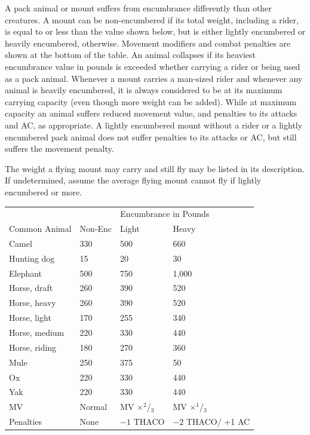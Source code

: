 \begin{multicols}{2}
A pack animal or mount suffers from encumbrance differently than other creatures.  A mount can be non-encumbered if its total weight, including a rider, is equal to or less than the value shown below, but is either lightly encumbered or heavily encumbered, otherwise.  Movement modifiers and combat penalties are shown at the bottom of the table.  An animal collapses if its heaviest encumbrance value in pounds is exceeded whether carrying a rider or being used as a pack animal.  Whenever a mount carries a man-sized rider and whenever any animal is heavily encumbered, it is always considered to be at its maximum carrying capacity (even though more weight can be added).  While at maximum capacity an animal suffers reduced movement value, and penalties to its attacks and AC, as appropriate.  A lightly encumbered mount without a rider or a lightly encumbered pack animal does not suffer penalties to its attacks or AC, but still suffers the movement penalty.  

The weight a flying mount may carry and still fly may be listed in its description.  If undetermined, assume the average flying mount cannot fly if lightly encumbered or more.

\noindent
\begin{minipage}{\columnwidth}

\label{encdomestic}
\noindent
\begin{tabular}{|p{}|p{}|p{}|p{}|}
\hline
	& \multicolumn{3}{c|}{Encumbrance in Pounds} \\
Common Animal	& Non-Enc	& Light	& Heavy \\
\hline\hline
\rowcolor[gray]{.9}Camel			& 330	& 500	& 660 \\
Hunting dog		& 15	& 20	& 30 \\
\rowcolor[gray]{.9}Elephant		& 500	& 750	& 1,000 \\
Horse, draft	& 260	& 390	& 520 \\
\rowcolor[gray]{.9}Horse, heavy	& 260	& 390	& 520 \\
Horse, light	& 170	& 255	& 340 \\
\rowcolor[gray]{.9}Horse, medium	& 220	& 330	& 440 \\
Horse, riding	& 180	& 270	& 360 \\
\rowcolor[gray]{.9}Mule			& 250	& 375	& 50 \\
Ox				& 220	& 330	& 440 \\
\rowcolor[gray]{.9}Yak				& 220	& 330	& 440 \\
\hline\hline
MV	& Normal	& MV $\times$$^2$/$_3$	& MV $\times$$^1$/$_3$ \\
\rowcolor[gray]{.9}Penalties	& None	& $-1$ THACO	& $-2$ THACO/ +1 AC \\
\hline
\end{tabular}


\end{minipage}
\end{multicols}
